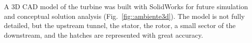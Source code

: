


A 3D CAD model of the turbine was built with
SolidWorks\raisebox{1ex}{\textregistered} for future simulation and conceptual
solution analysis (Fig.~\ref{fig::ambiente3d}). The model is not fully
detailed, but the upstream tunnel, the stator, the rotor, a small sector of the downstream, and the hatches are represented with great accuracy.


